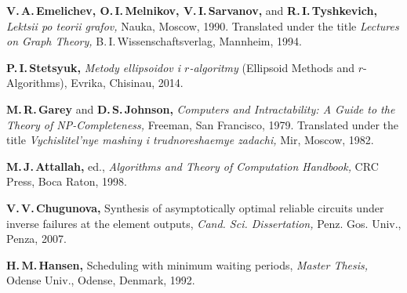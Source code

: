 \documentclass[10pt]{article}
\begin{document}
\begin{thebibliography}{99}
\textbf{V.\,A.\,Emelichev, O.\,I.\,Melnikov, V.\,I.\,Sarvanov,} and \textbf{R.\,I.\,Tyshkevich,} 
\textit{Lektsii po teorii grafov,} Nauka, Moscow, 1990. Translated under the title 
\textit{Lectures on Graph Theory,} B.\,I.\,Wissen\-schaftsverlag, Mannheim, 1994.

\textbf{P.\,I.\,Stetsyuk,} 
\textit{Metody ellipsoidov i $r$-algoritmy} (Ellipsoid Methods and $r$-Algorithms), Evrika, Chisinau, 2014.

\textbf{M.\,R.\,Garey} and \textbf{D.\,S.\,Johnson,} 
\textit{Computers and Intractability: A Guide to the Theory of NP-Completeness,} Freeman, San Francisco, 1979. 
Translated under the title \textit{Vychislitel'nye mashiny i trudnoreshaemye zadachi,} Mir, Moscow, 1982.

\textbf{M.\,J.\,Attallah,} ed., 
\textit{Algorithms and Theory of Computation Handbook,} CRC Press, Boca Raton, 1998.

\textbf{V.\,V.\,Chugunova,} Synthesis of asymptotically optimal reliable circuits under inverse failures 
at the element outputs, \textit{Cand. Sci. Dissertation,} Penz. Gos. Univ., Penza, 2007.

\textbf{H.\,M.\,Hansen,} Scheduling with minimum waiting periods, \textit{Master Thesis,} 
Odense Univ., Odense, Denmark, 1992.

\end{thebibliography}
\end{document}
